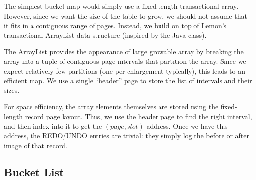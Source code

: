 \documentclass[10pt,letterpaper,twocolumn,english]{article}
\newcommand{\yad}{Lemon\xspace}
\newcommand{\rcs}[1]{\textcolor{green}{\bf RCS: #1}}
\begin{document}
The simplest bucket map would simply use a fixed-length transactional
array. However, since we want the size of the table to grow, we should
not assume that it fits in a contiguous range of pages. Instead, we build
on top of \yad's transactional ArrayList data structure (inspired by
the Java class).

The ArrayList provides the appearance of large growable array by
breaking the array into a tuple of contiguous page intervals that
partition the array.  Since we expect relatively few partitions (one
per enlargement typically), this leads to an efficient map. We use a
single ``header'' page to store the list of intervals and their sizes.

For space efficiency, the array elements themselves are stored using
the fixed-length record page layout. Thus, we use the header page to
find the right interval, and then index into it to get the $(page,
slot)$ address.  Once we have this address, the REDO/UNDO entries are
trivial: they simply log the before or after image of that record.






\subsection{Bucket List}
\end{document}
